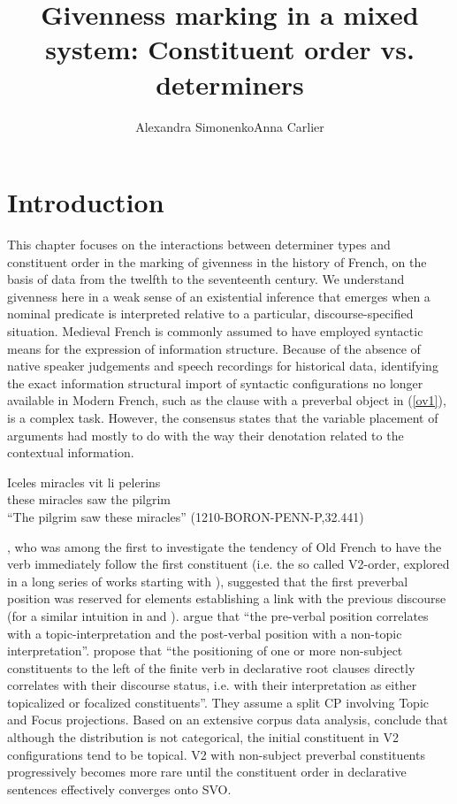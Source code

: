 \documentclass[output=paper,modfonts,nonflat]{langsci/langscibook}
\title{Givenness marking in a mixed system: Constituent order vs. determiners}
\author{Alexandra Simonenko\affiliation{Research Foundation Flanders \& Ghent University}\lastand Anna Carlier\affiliation{Université de Lille}}
\begin{document}
\maketitle
\section{Introduction} 

This chapter focuses on the interactions between determiner types and constituent order in the marking of givenness in the history of French, on the basis of data from the twelfth to the seventeenth century. We understand givenness here in a weak sense of an existential inference that emerges when a nominal predicate is interpreted relative to a particular, discourse-specified situation. Medieval French is commonly assumed to have employed syntactic means for the expression of information structure. Because of the absence of native speaker judgements and speech recordings for historical data, identifying the exact information structural import of syntactic configurations no longer available in Modern French, such as the clause with a preverbal object in (\ref{ov1}), is a complex task. However, the consensus states that the variable placement of arguments had mostly to do with the way their denotation related to the contextual information.

\ea \label{ov1}
\gll Iceles miracles vit li pelerins\\
 these miracles saw the pilgrim\\
\glt ``The pilgrim saw these miracles'' \hfill \tiny{(1210-BORON-PENN-P,32.441)}\label{ex:ovs}
\z



\citet{MarchelloNizia:1995}, who was among the first to investigate the tendency of Old French to have the verb immediately follow the first constituent (i.e. the so called V2-order, explored in a long series of works starting with \citet{Skarup:1975}), suggested that the first preverbal position was reserved for elements establishing a link with the previous discourse (for a similar intuition in \citet{Vennemann:1974} and \citet{Harris:1978}). \citet[117]{RinkeMeisel:2009} argue that ``the pre-verbal position correlates with a topic-interpretation and the post-verbal position with a non-topic interpretation''. \citet[24]{KaiserZimmermann:2011} propose that ``the positioning of one or more non-subject constituents to the left of the finite verb in declarative root clauses directly correlates with their discourse status, i.e. with their interpretation as either topicalized or focalized constituents''. They assume a split CP involving Topic and Focus projections. Based on an extensive corpus data analysis, \citet{LabelleHirschbuhler:2018} conclude that although the distribution is not categorical, the initial constituent in V2 configurations tend to be topical. V2 with non-subject preverbal constituents progressively becomes more rare until the constituent order in declarative sentences effectively converges onto SVO.
\end{document}
